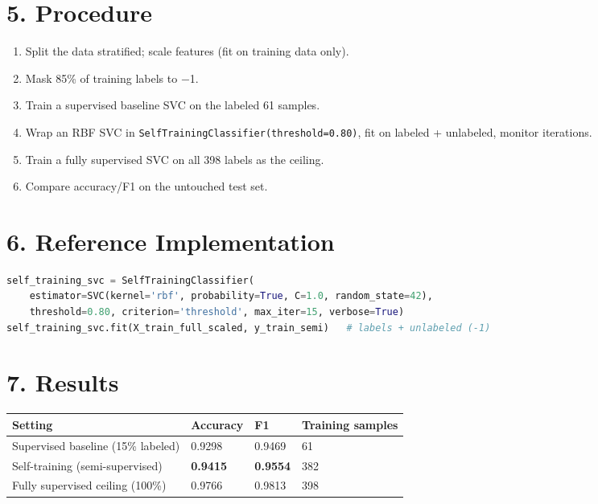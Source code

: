 \section{5. Procedure}\label{procedure}

\begin{enumerate}
\def\labelenumi{\arabic{enumi}.}
\tightlist
\item
  Split the data stratified; scale features (fit on training data only).
\item
  Mask 85\% of training labels to −1.
\item
  Train a supervised baseline SVC on the labeled 61 samples.
\item
  Wrap an RBF SVC in
  \passthrough{\lstinline!SelfTrainingClassifier(threshold=0.80)!}, fit
  on labeled + unlabeled, monitor iterations.
\item
  Train a fully supervised SVC on all 398 labels as the ceiling.
\item
  Compare accuracy/F1 on the untouched test set.
\end{enumerate}

\section{6. Reference Implementation}\label{reference-implementation}

\begin{lstlisting}[language=Python]
self_training_svc = SelfTrainingClassifier(
    estimator=SVC(kernel='rbf', probability=True, C=1.0, random_state=42),
    threshold=0.80, criterion='threshold', max_iter=15, verbose=True)
self_training_svc.fit(X_train_full_scaled, y_train_semi)   # labels + unlabeled (-1)
\end{lstlisting}

\section{7. Results}\label{results}

{\def\LTcaptype{none} %
\begin{longtable}[]{@{}llll@{}}
\toprule\noalign{}
Setting & Accuracy & F1 & Training samples \\
\midrule\noalign{}
\endhead
\bottomrule\noalign{}
\endlastfoot
Supervised baseline (15\% labeled) & 0.9298 & 0.9469 & 61 \\
Self-training (semi-supervised) & \textbf{0.9415} & \textbf{0.9554} &
382 \\
Fully supervised ceiling (100\%) & 0.9766 & 0.9813 & 398 \\
\end{longtable}
}


